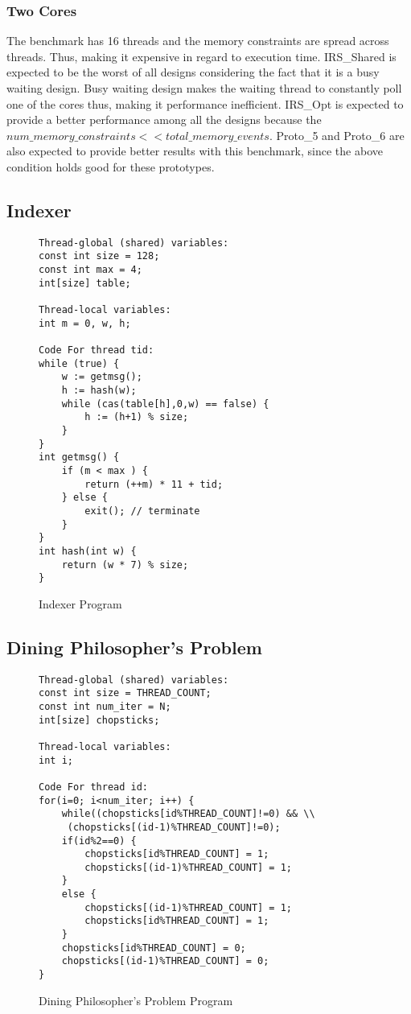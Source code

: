 \subsubsection{Two Cores}

The benchmark has 16 threads and the memory constraints are spread across threads. 
Thus, making it expensive in regard to execution time. 
IRS\_Shared is expected to be the worst of all designs considering the fact that it is a busy waiting design. 
Busy waiting design makes the waiting thread to constantly poll one of the cores thus, making it performance inefficient. 
IRS\_Opt is expected to provide a better performance among all the designs because the $num\_memory\_constraints << total\_memory\_events$. 
Proto\_5 and Proto\_6 are also expected to provide better results with this benchmark, since the above condition holds good for these prototypes.

\subsection{Indexer}

\begin{figure}[h]
\begin{lstlisting}[style=customc]
Thread-global (shared) variables:
const int size = 128;
const int max = 4;
int[size] table;

Thread-local variables:
int m = 0, w, h;

Code For thread tid:
while (true) {
	w := getmsg();
	h := hash(w);
	while (cas(table[h],0,w) == false) {
		h := (h+1) % size;
	}
}
int getmsg() {
	if (m < max ) {
		return (++m) * 11 + tid;
	} else {
		exit(); // terminate
	}
}
int hash(int w) {
	return (w * 7) % size;
}
\end{lstlisting}
\label{code_indexer}
\caption{Indexer Program}
\end{figure}


\subsection{Dining Philosopher's Problem}

\begin{figure}[h]
\begin{lstlisting}[style=customc]
Thread-global (shared) variables:
const int size = THREAD_COUNT;
const int num_iter = N;
int[size] chopsticks;

Thread-local variables:
int i;

Code For thread id:
for(i=0; i<num_iter; i++) {
	while((chopsticks[id%THREAD_COUNT]!=0) && \\
	 (chopsticks[(id-1)%THREAD_COUNT]!=0);
	if(id%2==0) {
		chopsticks[id%THREAD_COUNT] = 1;
		chopsticks[(id-1)%THREAD_COUNT] = 1;
	}
	else {
		chopsticks[(id-1)%THREAD_COUNT] = 1;
		chopsticks[id%THREAD_COUNT] = 1;
	}
	chopsticks[id%THREAD_COUNT] = 0;
	chopsticks[(id-1)%THREAD_COUNT] = 0;
}
\end{lstlisting}
\label{code_dining_phil}
\caption{Dining Philosopher's Problem Program}
\end{figure}